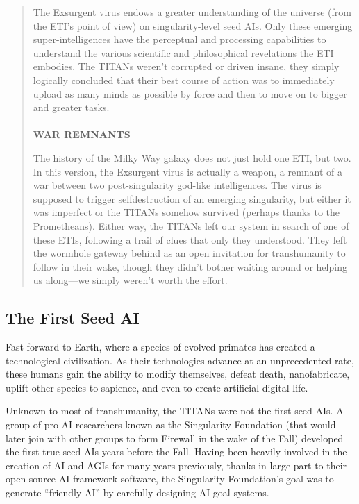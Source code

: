 \begin{quotation}
The Exsurgent virus endows a greater understanding
of the universe (from the ETI’s point of view)
on singularity-level seed AIs. Only these emerging
super-intelligences have the perceptual and
processing capabilities to understand the various
scientific and philosophical revelations the ETI
embodies. The TITANs weren’t corrupted or driven
insane, they simply logically concluded that their
best course of action was to immediately upload
as many minds as possible by force and then to
move on to bigger and greater tasks.
\\
\\
\textbf{WAR REMNANTS}

The history of the Milky Way galaxy does not
just hold one ETI, but two. In this version, the
Exsurgent virus is actually a weapon, a remnant
of a war between two post-singularity god-like
intelligences. The virus is supposed to trigger selfdestruction
of an emerging singularity, but either
it was imperfect or the TITANs somehow survived
(perhaps thanks to the Prometheans). Either
way, the TITANs left our system in search of one
of these ETIs, following a trail of clues that only
they understood. They left the wormhole gateway
behind as an open invitation for transhumanity to
follow in their wake, though they didn’t bother
waiting around or helping us along—we simply
weren’t worth the effort.
\end{quotation}


\subsection{The First Seed AI}

Fast forward to Earth, where a species of evolved primates
has created a technological civilization. As their
technologies advance at an unprecedented rate, these 
humans gain the ability to modify themselves, defeat 
death, nanofabricate, uplift other species to sapience, 
and even to create artificial digital life. 

Unknown to most of transhumanity, the TITANs 
were not the first seed AIs. A group of pro-AI researchers
known as the Singularity Foundation (that
would later join with other groups to form Firewall in 
the wake of the Fall) developed the first true seed AIs 
years before the Fall. Having been heavily involved in 
the creation of AI and AGIs for many years previously, 
thanks in large part to their open source AI framework
software, the Singularity Foundation's goal was
to generate ``friendly AI'' by carefully designing AI 
goal systems.

